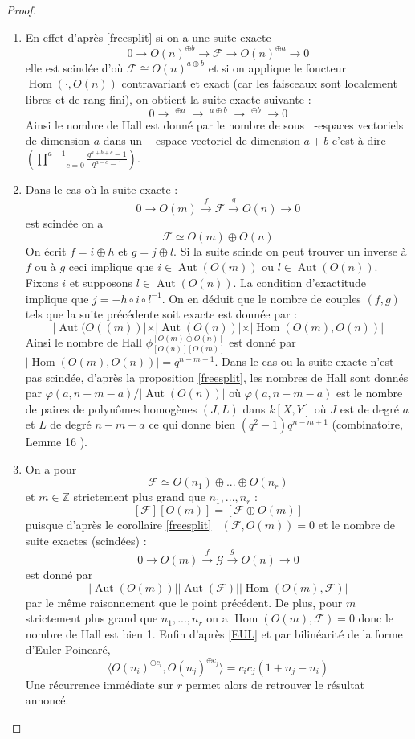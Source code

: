 \documentclass[12pt]{article}
\DeclareMathOperator{\aut}{Aut}
\DeclareMathOperator{\Hom}{Hom}
\DeclareMathOperator{\ext}{Ext^{1}}
\DeclareMathOperator{\Fq}{\mathbb{F}_{q}}
\theoremstyle{definition}
\begin{document}
\begin{proof}\begin{enumerate} 
\item  En effet d'après \ref{freesplit} si on a une suite exacte $$0\longrightarrow O(n)^{\oplus b}\longrightarrow \mathcal{F}\longrightarrow O(n)^{\oplus a}\longrightarrow 0$$ elle est scindée d'où $\mathcal{F}\cong O(n)^{a\oplus b}$ et si on applique le foncteur $\Hom(\cdot,O(n))$ contravariant et exact (car les faisceaux sont localement libres et de rang fini), on obtient la suite exacte suivante : $$0\longrightarrow \Fq^{\oplus a}\longrightarrow \Fq^{a\oplus b}\longrightarrow \Fq^{\oplus b}\longrightarrow 0$$ Ainsi le nombre de Hall est donné par le nombre de sous $\Fq$-espaces vectoriels de dimension $a$ dans un $\Fq$ espace vectoriel de dimension $a+b$ c'est à dire $\left(\underset{c=0}{\overset{a-1}{\prod}}\frac{q^{a+b+c}-1}{q^{a-c}-1}\right)$. 
\item Dans le cas où la suite exacte : $$0\longrightarrow O(m)\overset{f}{\longrightarrow} \mathcal{F}\overset{g}{\longrightarrow} O(n)\longrightarrow 0$$ est scindée on a $$\mathcal{F}\simeq O(m)\oplus O(n)$$ On écrit $f=i\oplus h$ et $g=j\oplus l$. Si la suite scinde on peut trouver un inverse à $f$ ou à $g$ ceci implique que $i\in\aut(O(m))$ ou $l\in\aut(O(n))$. Fixons $i$ et supposons $l\in\aut(O(n))$. La condition d'exactitude implique que $j=-h\circ i\circ l^{-1}$. On en déduit que le nombre de couples $(f,g)$ tels que la suite précédente soit exacte est donnée par  : $$\vert\aut(O((m))\vert\times\vert\aut(O(n))\vert\times\vert\Hom(O(m),O(n))\vert$$ Ainsi le nombre de Hall $\phi^{[O(m)\oplus O(n)]}_{[O(n)][O(m)]}$ est donné par $\vert\Hom(O(m),O(n))\vert=q^{n-m+1}$. Dans le cas ou la suite exacte n'est pas scindée, d'après la proposition \ref{freesplit}, les nombres de Hall sont donnés par $\varphi(a,n-m-a)/\vert\aut(O(n))\vert$ où $\varphi(a,n-m-a)$ est le nombre de paires de polynômes homogènes $(J,L)$  dans $k[X,Y]$ où $J$ est de degré $a$ et $L$ de degré $n-m-a$ ce qui donne bien $(q^2-1)q^{n-m+1}$ (combinatoire, Lemme 16 \cite{Baum}).
\item On a  pour $$\mathcal{F}\simeq O(n_{1})\oplus ...\oplus O(n_{r})$$ et $m\in\mathbb{Z}$ strictement plus grand que $n_1,...,n_r$ : $$[\mathcal{F}][O(m)]=[\mathcal{F}\oplus O(m)]$$ puisque d'après le corollaire \ref{freesplit} $\ext(\mathcal{F},O(m))=0$ et le nombre de suite exactes (scindées) : $$0\longrightarrow O(m)\overset{f}{\longrightarrow} \mathcal{G}\overset{g}{\longrightarrow} O(n)\longrightarrow 0$$ est donné par $$\vert\aut(O(m))\vert\vert\aut(\mathcal{F})\vert\vert\Hom(O(m),\mathcal{F})\vert$$ par le même raisonnement que le point précédent. De plus, pour $m$ strictement plus grand que $n_1,...,n_r$ on a  $\Hom(O(m),\mathcal{F})=0$ donc le nombre de Hall est bien 1. Enfin d'après \ref{EUL} et par bilinéarité de la forme d'Euler Poincaré, $$\langle O(n_i)^{\oplus c_i}, O(n_j)^{\oplus c_j}\rangle = c_ic_j(1+n_j-n_i)$$ Une récurrence immédiate sur $r$ permet alors de retrouver le résultat annoncé.\end{enumerate}
\end{proof}
\end{document}
